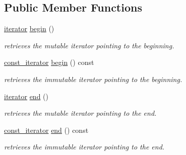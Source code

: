 \subsection*{Public Member Functions}
\begin{DoxyCompactItemize}
\item 
\hypertarget{classhryky_1_1_array_a12db8f567aa91dbbae25dca68db6e4d3}{\hyperlink{classhryky_1_1iterator_1_1random_1_1_mutable}{iterator} \hyperlink{classhryky_1_1_array_a12db8f567aa91dbbae25dca68db6e4d3}{begin} ()}\label{classhryky_1_1_array_a12db8f567aa91dbbae25dca68db6e4d3}

\begin{DoxyCompactList}\small\item\em retrieves the mutable iterator pointing to the beginning. \end{DoxyCompactList}\item 
\hypertarget{classhryky_1_1_array_a2e6fb08c9e286b0f33e17b98182a4cc7}{\hyperlink{classhryky_1_1iterator_1_1random_1_1_immutable}{const\-\_\-iterator} \hyperlink{classhryky_1_1_array_a2e6fb08c9e286b0f33e17b98182a4cc7}{begin} () const}\label{classhryky_1_1_array_a2e6fb08c9e286b0f33e17b98182a4cc7}

\begin{DoxyCompactList}\small\item\em retrieves the immutable iterator pointing to the beginning. \end{DoxyCompactList}\item 
\hypertarget{classhryky_1_1_array_a56e39a6620eeb368c9b237a82d7507bb}{\hyperlink{classhryky_1_1iterator_1_1random_1_1_mutable}{iterator} \hyperlink{classhryky_1_1_array_a56e39a6620eeb368c9b237a82d7507bb}{end} ()}\label{classhryky_1_1_array_a56e39a6620eeb368c9b237a82d7507bb}

\begin{DoxyCompactList}\small\item\em retrieves the mutable iterator pointing to the end. \end{DoxyCompactList}\item 
\hypertarget{classhryky_1_1_array_a1aa3afc76c5f450c572fef4a3cf0254d}{\hyperlink{classhryky_1_1iterator_1_1random_1_1_immutable}{const\-\_\-iterator} \hyperlink{classhryky_1_1_array_a1aa3afc76c5f450c572fef4a3cf0254d}{end} () const}\label{classhryky_1_1_array_a1aa3afc76c5f450c572fef4a3cf0254d}

\begin{DoxyCompactList}\small\item\em retrieves the immutable iterator pointing to the end. \end{DoxyCompactList}\end{DoxyCompactItemize}



